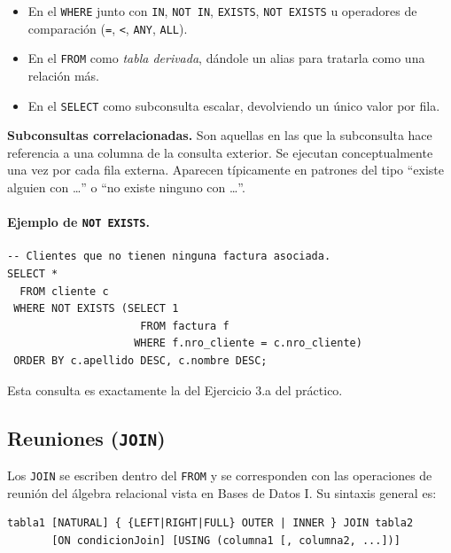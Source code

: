 \documentclass[11pt,a4paper]{article}
\begin{document}
\begin{itemize}
    \item En el \texttt{WHERE} junto con \texttt{IN}, \texttt{NOT IN},
    \texttt{EXISTS}, \texttt{NOT EXISTS} u operadores de comparación
    (\texttt{=}, \texttt{<}, \texttt{ANY}, \texttt{ALL}).
    \item En el \texttt{FROM} como \emph{tabla derivada}, dándole un alias
    para tratarla como una relación más.
    \item En el \texttt{SELECT} como subconsulta escalar, devolviendo un
    único valor por fila.
\end{itemize}

\textbf{Subconsultas correlacionadas.} Son aquellas en las que la subconsulta
hace referencia a una columna de la consulta exterior. Se ejecutan
conceptualmente una vez por cada fila externa. Aparecen típicamente en
patrones del tipo ``existe alguien con \dots'' o ``no existe ninguno
con \dots''.

\paragraph{Ejemplo de \texttt{NOT EXISTS}.}

\begin{lstlisting}
-- Clientes que no tienen ninguna factura asociada.
SELECT *
  FROM cliente c
 WHERE NOT EXISTS (SELECT 1
                     FROM factura f
                    WHERE f.nro_cliente = c.nro_cliente)
 ORDER BY c.apellido DESC, c.nombre DESC;
\end{lstlisting}

Esta consulta es exactamente la del Ejercicio 3.a del práctico.

\subsection{Reuniones (\texttt{JOIN})}

Los \texttt{JOIN} se escriben dentro del \texttt{FROM} y se corresponden con
las operaciones de reunión del álgebra relacional vista en Bases de Datos I.
Su sintaxis general es:

\begin{lstlisting}
tabla1 [NATURAL] { {LEFT|RIGHT|FULL} OUTER | INNER } JOIN tabla2
       [ON condicionJoin] [USING (columna1 [, columna2, ...])]
\end{lstlisting}
\end{document}
